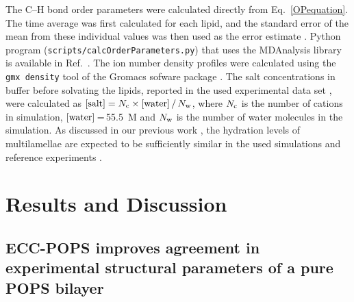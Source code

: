 \documentclass[journal=jpcbfk,manuscript=article]{achemso}
\begin{document}
The C--H bond order parameters were calculated directly from Eq.~\ref{OPequation}.
The time average was first calculated for each lipid, and
the standard error of the mean from these individual values was then used as the
error estimate \cite{botan15,ollila16,NMRlipidsIV}.
Python program ({\tt scripts/calcOrderParameters.py}) that uses the
MDAnalysis library \cite{agrawal11,gowers16} is available in Ref.~. 
The ion number density profiles were calculated using the {\tt gmx density} tool
of the Gromacs sofware package \cite{gromacsMANUAL}.
The salt concentrations in buffer before solvating the lipids, reported in the used experimental data set \cite{roux90},
were calculated as $[{\rm salt}]=N_{\rm c} \times[{\rm water}]\,/\,N_{\rm w}$,
where $N_{\rm c}$ is the number of cations in simulation, $[{\rm water}]$\,=\,55.5~M and $N_{\rm w}$
is the number of water molecules in the simulation.
As discussed in our previous work \cite{NMRlipidsIV}, the hydration levels of
multilamellae are expected to be sufficiently similar in the used simulations and reference experiments \cite{roux90}.










\section{Results and Discussion} 
 
\subsection{ECC-POPS improves agreement in experimental structural parameters of a pure POPS bilayer } 
 
\end{document}
